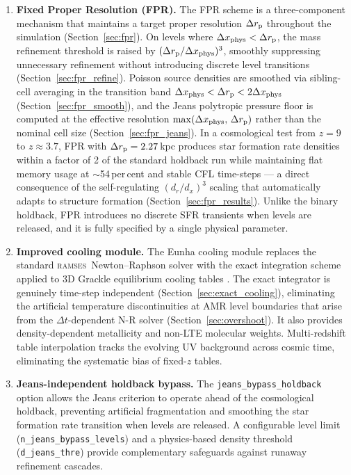 \documentclass[fleqn,usenatbib]{mnras}
\newcommand{\ramses}{\textsc{ramses}}
\newcommand{\code}[1]{\texttt{#1}}
\newcommand{\drp}{\Delta r_{\rm p}}
\newcommand{\dxp}{\Delta x_{\rm phys}}
\begin{document}
\begin{enumerate}
  \item \textbf{Fixed Proper Resolution (FPR).}
    The FPR scheme \citep{Gnedin2016} is a three-component mechanism
    that maintains a target proper resolution $\drp$ throughout the
    simulation (Section~\ref{sec:fpr}).  On levels where
    $\dxp < \drp$, the mass refinement threshold is raised by
    $(\drp/\dxp)^3$, smoothly suppressing unnecessary refinement
    without introducing discrete level transitions
    (Section~\ref{sec:fpr_refine}).  Poisson source densities are
    smoothed via sibling-cell averaging in the transition band
    $\dxp < \drp < 2\dxp$ (Section~\ref{sec:fpr_smooth}), and the
    Jeans polytropic pressure floor is computed at the effective
    resolution $\max(\dxp,\,\drp)$ rather than the nominal cell size
    (Section~\ref{sec:fpr_jeans}).  In a cosmological test from
    $z = 9$ to $z \approx 3.7$, FPR with $\drp = 2.27$\,kpc produces
    star formation rate densities within a factor of 2 of the standard
    holdback run while maintaining flat memory usage at $\sim$54\,per\,cent
    and stable CFL time-steps --- a direct consequence of the
    self-regulating $(d_r/d_x)^3$ scaling that automatically adapts to
    structure formation (Section~\ref{sec:fpr_results}).
    Unlike the binary holdback, FPR introduces no discrete SFR
    transients when levels are released, and it is fully specified by a
    single physical parameter.

  \item \textbf{Improved cooling module.}  The Eunha cooling module
    replaces the standard \ramses\ Newton--Raphson solver with the
    \citet{Townsend2009} exact integration scheme applied to 3D Grackle
    equilibrium cooling tables \citep{Smith2017}.  The exact integrator
    is genuinely time-step independent
    (Section~\ref{sec:exact_cooling}), eliminating the artificial
    temperature discontinuities at AMR level boundaries that arise from
    the $\Delta t$-dependent N-R solver
    (Section~\ref{sec:overshoot}).  It also provides
    density-dependent metallicity and non-LTE molecular weights.
    Multi-redshift table interpolation tracks the evolving UV
    background \citep{HM2012} across cosmic time, eliminating the
    systematic bias of fixed-$z$ tables.

  \item \textbf{Jeans-independent holdback bypass.}  The
    \code{jeans\_bypass\_holdback} option allows the Jeans criterion to
    operate ahead of the cosmological holdback, preventing artificial
    fragmentation and smoothing the star formation rate transition when
    levels are released.  A configurable level limit
    (\code{n\_jeans\_bypass\_levels}) and a physics-based density
    threshold (\code{d\_jeans\_thre}) provide complementary safeguards
    against runaway refinement cascades.


\end{enumerate}
\end{document}
